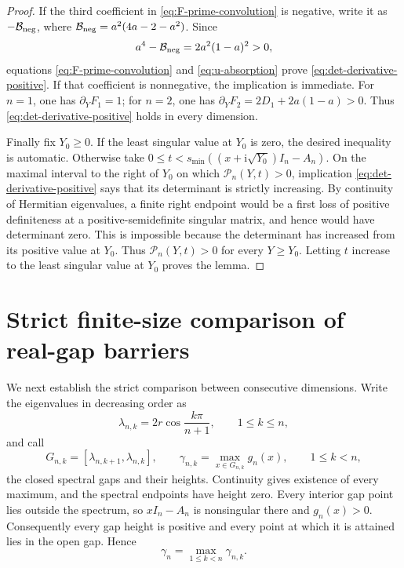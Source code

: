 \documentclass[review,hidelinks,onefignum,onetabnum]{siamart251216}
\newcommand{\ii}{\mathrm i}
\begin{document}
\begin{proof}
If the third coefficient in \eqref{eq:F-prime-convolution} is negative,
write it as \(-\mathcal B_{\rm neg}\), where
\(\mathcal B_{\rm neg}=a^2(4a-2-a^2)\).  Since
\[
 a^4-\mathcal B_{\rm neg}=2a^2(1-a)^2>0,
\]
equations \eqref{eq:F-prime-convolution} and \eqref{eq:u-absorption}
prove \eqref{eq:det-derivative-positive}.  If that coefficient is
nonnegative, the implication is immediate.  For \(n=1\), one has
\(\partial_YF_1=1\); for \(n=2\), one has
\(\partial_YF_2=2D_1+2a(1-a)>0\).  Thus
\eqref{eq:det-derivative-positive} holds in every dimension.

Finally fix \(Y_0\geq0\).  If the least singular value at
\(Y_0\) is zero, the desired inequality is automatic.  Otherwise take
\(0\leq t<s_{\min}((x+\ii\sqrt{Y_0})I_n-A_n)\).  On the maximal interval to the
right of \(Y_0\) on which \(\mathcal P_n(Y,t)>0\), implication
\eqref{eq:det-derivative-positive} says that its determinant is strictly
increasing.  By continuity of Hermitian eigenvalues, a finite right
endpoint would be a first loss of positive definiteness at a
positive-semidefinite singular matrix, and hence would have determinant
zero.  This is impossible because the determinant has increased from
its positive value at \(Y_0\).
Thus \(\mathcal P_n(Y,t)>0\) for every \(Y\geq Y_0\).  Letting \(t\) increase to
the least singular value at \(Y_0\) proves the lemma.
\end{proof}

\section{Strict finite-size comparison of real-gap barriers}
\label{sec:mesh}

We next establish the strict comparison between consecutive dimensions.
Write the eigenvalues in decreasing order as
\[
 \lambda_{n,k}=2r\cos\frac{k\pi}{n+1},\qquad 1\leq k\leq n,
\]
and call
\[
 G_{n,k}=[\lambda_{n,k+1},\lambda_{n,k}],\qquad
 \gamma_{n,k}=\max_{x\in G_{n,k}}g_n(x),\qquad 1\leq k<n,
\]
the closed spectral gaps and their heights.  Continuity gives existence of
every maximum, and the spectral endpoints have height zero.  Every interior
gap point lies outside the spectrum, so \(xI_n-A_n\) is nonsingular there and
\(g_n(x)>0\).  Consequently every gap height is positive and every point at
which it is attained lies in the open gap.  Hence
\begin{equation}\label{eq:gamma-def}
 \gamma_n=\max_{1\leq k<n}\gamma_{n,k}.
\end{equation}
\end{document}
